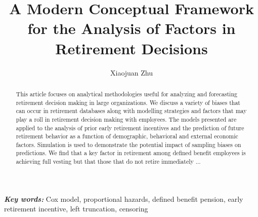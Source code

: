 \documentclass[12pt,letterpaper]{article}
\title{A Modern Conceptual Framework for the Analysis of Factors in Retirement Decisions}
\author{Xiaojuan Zhu}
\providecommand{\keywords}[1]{\textbf{\textit{Key words:}} #1} %
\begin{document}
\maketitle

\begin{abstract}
This article focuses on analytical methodologies useful for analyzing and forecasting retirement decision making in large organizations.  We discuss a variety of biases that can occur in retirement databases along with modelling strategies and factors that may play a roll in retirement decision making with employees. The models presented are applied to the analysis of prior early retirement incentives and the prediction of future retirement behavior as a function of demographic, behavioral and external economic factors. Simulation is used to demonstrate the potential impact of sampling biases on predictions. We find that a key factor in retirement among defined benefit employees is achieving full vesting but that those that do not retire immediately ...

\end{abstract}

\keywords {Cox model, proportional hazards, defined benefit pension, early retirement incentive, left truncation, censoring}


\end{document}
